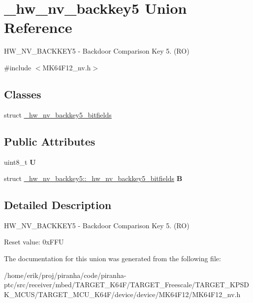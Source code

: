 \hypertarget{union__hw__nv__backkey5}{}\section{\+\_\+hw\+\_\+nv\+\_\+backkey5 Union Reference}
\label{union__hw__nv__backkey5}


H\+W\+\_\+\+N\+V\+\_\+\+B\+A\+C\+K\+K\+E\+Y5 -\/ Backdoor Comparison Key 5. (RO)  




{\ttfamily \#include $<$M\+K64\+F12\+\_\+nv.\+h$>$}

\subsection*{Classes}
\begin{DoxyCompactItemize}
\item 
struct \hyperlink{struct__hw__nv__backkey5_1_1__hw__nv__backkey5__bitfields}{\+\_\+hw\+\_\+nv\+\_\+backkey5\+\_\+bitfields}
\end{DoxyCompactItemize}
\subsection*{Public Attributes}
\begin{DoxyCompactItemize}
\item 
uint8\+\_\+t {\bfseries U}\hypertarget{union__hw__nv__backkey5_a488845f9eb8cefa9f37cfe0447c7bb23}{}\label{union__hw__nv__backkey5_a488845f9eb8cefa9f37cfe0447c7bb23}

\item 
struct \hyperlink{struct__hw__nv__backkey5_1_1__hw__nv__backkey5__bitfields}{\+\_\+hw\+\_\+nv\+\_\+backkey5\+::\+\_\+hw\+\_\+nv\+\_\+backkey5\+\_\+bitfields} {\bfseries B}\hypertarget{union__hw__nv__backkey5_aae9a145132d86ea2ecd0b3345a326f20}{}\label{union__hw__nv__backkey5_aae9a145132d86ea2ecd0b3345a326f20}

\end{DoxyCompactItemize}


\subsection{Detailed Description}
H\+W\+\_\+\+N\+V\+\_\+\+B\+A\+C\+K\+K\+E\+Y5 -\/ Backdoor Comparison Key 5. (RO) 

Reset value\+: 0x\+F\+FU 

The documentation for this union was generated from the following file\+:\begin{DoxyCompactItemize}
\item 
/home/erik/proj/piranha/code/piranha-\/ptc/src/receiver/mbed/\+T\+A\+R\+G\+E\+T\+\_\+\+K64\+F/\+T\+A\+R\+G\+E\+T\+\_\+\+Freescale/\+T\+A\+R\+G\+E\+T\+\_\+\+K\+P\+S\+D\+K\+\_\+\+M\+C\+U\+S/\+T\+A\+R\+G\+E\+T\+\_\+\+M\+C\+U\+\_\+\+K64\+F/device/device/\+M\+K64\+F12/M\+K64\+F12\+\_\+nv.\+h\end{DoxyCompactItemize}
